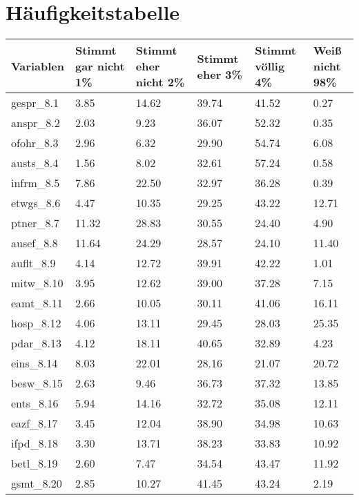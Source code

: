 \section{Häufigkeitstabelle}
\label{A}

\begin{table}[h]
\small

\begin{tabularx}{\textwidth}{XXXXXX}
\hline 
Variablen &
Stimmt gar nicht
1\% &
Stimmt eher nicht
2\% &
Stimmt eher
3\% &
Stimmt völlig
4\% &
Weiß nicht
98\% \\
\hline 
gespr\_8.1&
3.85&
14.62&
39.74&
41.52&
0.27\\
anspr\_8.2&
2.03&
9.23&
36.07&
52.32&
0.35\\
ofohr\_8.3&
2.96&
6.32&
29.90&
54.74&
6.08\\
austs\_8.4&
1.56&
8.02&
32.61&
57.24&
0.58\\
infrm\_8.5&
7.86&
22.50&
32.97&
36.28&
0.39\\
etwgs\_8.6&
4.47&
10.35&
29.25&
43.22&
12.71\\
ptner\_8.7&
11.32&
28.83&
30.55&
24.40&
4.90\\
ausef\_8.8&
11.64&
24.29&
28.57&
24.10&
11.40\\
auflt\_8.9&
4.14&
12.72&
39.91&
42.22&
1.01\\
mitw\_8.10&
3.95&
12.62&
39.00&
37.28&
7.15\\
eamt\_8.11&
2.66&
10.05&
30.11&
41.06&
16.11\\
hosp\_8.12&
4.06&
13.11&
29.45&
28.03&
25.35\\
pdar\_8.13&
4.12&
18.11&
40.65&
32.89&
4.23\\
eins\_8.14&
8.03&
22.01&
28.16&
21.07&
20.72\\
besw\_8.15&
2.63&
9.46&
36.73&
37.32&
13.85\\
ents\_8.16&
5.94&
14.16&
32.72&
35.08&
12.11\\
eazf\_8.17&
3.45&
12.04&
38.90&
34.98&
10.63\\
ifpd\_8.18&
3.30&
13.71&
38.23&
33.83&
10.92\\
betl\_8.19&
2.60&
7.47&
34.54&
43.47&
11.92\\
gsmt\_8.20&
2.85&
10.27&
41.45&
43.24&
2.19\\
\hline 
\end{tabularx} 
\end{table}